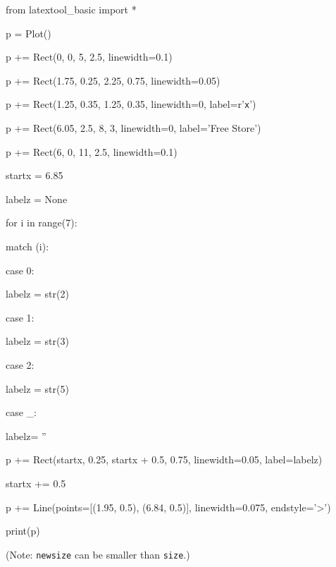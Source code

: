 \begin{python}

from latextool_basic import *

p = Plot()

p += Rect(0, 0, 5, 2.5, linewidth=0.1)

p += Rect(1.75, 0.25, 2.25, 0.75, linewidth=0.05)

p += Rect(1.25, 0.35, 1.25, 0.35, linewidth=0, label=r'\texttt{x}')



p += Rect(6.05, 2.5, 8, 3, linewidth=0, label='Free Store')

p += Rect(6, 0, 11, 2.5, linewidth=0.1)

startx = 6.85

labelz = None

for i in range(7):

    match (i):

          case 0:

               labelz = str(2)

          case 1:

               labelz = str(3)

          case 2:

               labelz = str(5)

          case _:

               labelz= ''

    p += Rect(startx, 0.25, startx + 0.5, 0.75, linewidth=0.05, label=labelz)

    startx += 0.5

p += Line(points=[(1.95, 0.5), (6.84, 0.5)], linewidth=0.075, endstyle='>')

print(p)

\end{python}



(Note: \texttt{newsize} can be smaller than \texttt{size}.)


